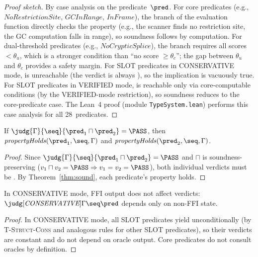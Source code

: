 \begin{proof}[Proof sketch]
By case analysis on the predicate~$\pred$.
For core predicates (e.g., $\mathit{NoRestrictionSite}$,
$\mathit{GCInRange}$, $\mathit{InFrame}$), the \PASS{} branch of
the evaluation function directly checks the property (e.g., the
scanner finds no restriction site, the GC computation falls in range),
so soundness follows by computation.
For dual-threshold predicates (e.g., $\mathit{NoCrypticSplice}$),
the \PASS{} branch requires all scores $< \theta_u$, which is a
stronger condition than ``no score $\ge \theta_c$''; the gap between
$\theta_u$ and $\theta_c$ provides a safety margin.
For SLOT predicates in CONSERVATIVE mode, \PASS{} is unreachable
(the verdict is always \UNCERTAIN{}), so the implication is vacuously
true.
For SLOT predicates in VERIFIED mode, \PASS{} is reachable only via
core-computable conditions (by the VERIFIED-mode restriction), so
soundness reduces to the core-predicate case.
The Lean~4 proof (module \texttt{TypeSystem.lean}) performs this case
analysis for all 28~predicates.
\end{proof}

\begin{corollary}\label{cor:comp}
If\/ $\judg{\Gamma}{\seq}{\pred_1 \sqcap \pred_2} = \PASS$, then
$\mathit{propertyHolds}(\pred_1, \seq, \Gamma)$ and
$\mathit{propertyHolds}(\pred_2, \seq, \Gamma)$.
\end{corollary}

\begin{proof}
Since $\judg{\Gamma}{\seq}{\pred_1 \sqcap \pred_2} = \PASS$ and
$\sqcap$ is soundness-preserving ($v_1 \sqcap v_2 = \PASS \Rightarrow
v_1 = v_2 = \PASS$), both individual verdicts must be \PASS.
By Theorem~\ref{thm:sound}, each predicate's property holds.
\end{proof}

\begin{corollary}\label{cor:slot}
In CONSERVATIVE mode, FFI output does not affect verdicts:
$\judg[\textit{CONSERVATIVE}]{\Gamma}{\seq}{\pred}$ depends only on
non-FFI state.
\end{corollary}

\begin{proof}
In CONSERVATIVE mode, all SLOT predicates yield \UNCERTAIN{}
unconditionally (by \textsc{T-Struct-Cons} and analogous rules for
other SLOT predicates), so their verdicts are constant and do not
depend on oracle output.
Core predicates do not consult oracles by definition.
\end{proof}

